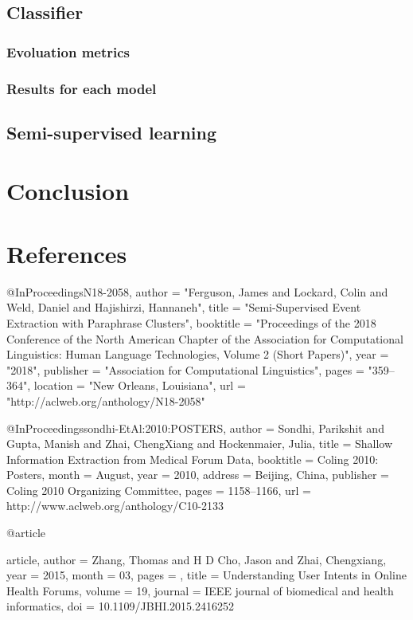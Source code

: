 \documentclass[11pt]{article}
\begin{document}
\subsection{Classifier}
\subsubsection{Evoluation metrics}


\subsubsection{Results for each model}

\subsection{Semi-supervised learning}

\section{Conclusion}


\section{References}

@InProceedings{N18-2058,
  author = 	"Ferguson, James
		and Lockard, Colin
		and Weld, Daniel
		and Hajishirzi, Hannaneh",
  title = 	"Semi-Supervised Event Extraction with Paraphrase Clusters",
  booktitle = 	"Proceedings of the 2018 Conference of the North American Chapter of the Association for Computational Linguistics: Human Language Technologies, Volume 2 (Short Papers)",
  year = 	"2018",
  publisher = 	"Association for Computational Linguistics",
  pages = 	"359--364",
  location = 	"New Orleans, Louisiana",
  url = 	"http://aclweb.org/anthology/N18-2058"
}

@InProceedings{sondhi-EtAl:2010:POSTERS,
  author    = {Sondhi, Parikshit  and  Gupta, Manish  and  Zhai, ChengXiang  and  Hockenmaier, Julia},
  title     = {Shallow Information Extraction from Medical Forum Data},
  booktitle = {Coling 2010: Posters},
  month     = {August},
  year      = {2010},
  address   = {Beijing, China},
  publisher = {Coling 2010 Organizing Committee},
  pages     = {1158--1166},
  url       = {http://www.aclweb.org/anthology/C10-2133}
}


@article{article,
author = {Zhang, Thomas and H D Cho, Jason and Zhai, Chengxiang},
year = {2015},
month = {03},
pages = {},
title = {Understanding User Intents in Online Health Forums},
volume = {19},
journal = {IEEE journal of biomedical and health informatics},
doi = {10.1109/JBHI.2015.2416252}

}
\end{document}
